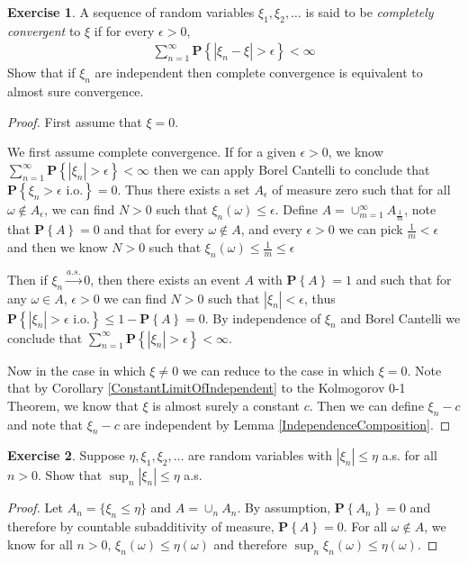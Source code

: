 \documentclass{amsbook}
\theoremstyle{definition}
\newtheorem{xca}{Exercise}
\theoremstyle{remark}
\newcommand{\probability}[1]{\textbf{P}\left \{#1 \right \}}
\newcommand{\abs}[1]{\left \vert #1 \right \vert}
\newcommand{\toas}{\overset{a.s.}\to}
\begin{document}
\begin{xca}A sequence of random variables $\xi_1, \xi_2, \dots$ is said
  to be \emph{completely convergent} to $\xi$ if for every $\epsilon > 0$,
\begin{align*}
\sum_{n=1}^\infty \probability{\abs{\xi_n - \xi} > \epsilon} < \infty
\end{align*}
Show that if $\xi_n$ are independent then complete convergence is
equivalent to almost sure convergence.
\end{xca}
\begin{proof}
First assume that $\xi=0$.  

We first assume complete convergence.  If for a given $\epsilon > 0$, we know $\sum_{n=1}^\infty
\probability{\abs{\xi_n} > \epsilon} < \infty$ then we can apply
Borel Cantelli to conclude that $\probability{\xi_n > \epsilon \text{ i.o.}} =
0$.  Thus there exists a set $A_\epsilon$ of measure zero such that
for all $\omega \notin A_\epsilon$, we can find $N>0$ such that
$\xi_n(\omega) \leq \epsilon$.  Define $A = \cup_{m=1}^\infty A_\frac{1}{m}$,
note that $\probability{A} = 0$ and that for every $\omega \notin A$,
and every $\epsilon >0$ we can pick $\frac{1}{m} < \epsilon$  and then
we know  $N>0$ such that $\xi_n(\omega) \leq \frac{1}{m} \leq \epsilon$

Then if $\xi_n \toas 0$, then there
exists an event $A$ with $\probability{A} = 1$ and such that for any
$\omega \in A$, $\epsilon>0$ we can find $N > 0$ such that
$\abs{\xi_n} < \epsilon$, thus $\probability{\abs{\xi_n} > \epsilon
  \text{ i.o.}} \leq 1 - \probability{A} = 0$.  By independence of
$\xi_n$ and Borel Cantelli we conclude that $\sum_{n=1}^\infty
\probability{\abs{\xi_n} > \epsilon} < \infty$.

Now in the case in which $\xi \neq 0$ we can reduce to the case in
which $\xi = 0$.  Note that by Corollary
\ref{ConstantLimitOfIndependent} to the Kolmogorov 0-1 Theorem, we
know that $\xi$ is almost surely a constant $c$.  Then we can define $\xi_n
- c$ and note that $\xi_n - c$ are independent by Lemma \ref{IndependenceComposition}.
\end{proof}

\begin{xca}Suppose $\eta, \xi_1, \xi_2, \dots$ are random variables with
  $\abs{\xi_n} \leq \eta$ a.s. for all $n > 0$.  Show that $\sup_n
  \abs{\xi_n} \leq \eta$ a.s.
\end{xca}
\begin{proof}
Let $A_n = \lbrace \xi_n \leq \eta \rbrace$ and $A = \cup_n A_n$.
By assumption,
$\probability{A_n} =0$ and therefore by countable subadditivity of measure,
$\probability{A} = 0$.  For all $\omega \notin A$, we know for all
$n>0$, $\xi_n(\omega) \leq \eta(\omega)$ and therefore
$\sup_n\xi_n(\omega) \leq \eta(\omega)$.
\end{proof}
\end{document}
